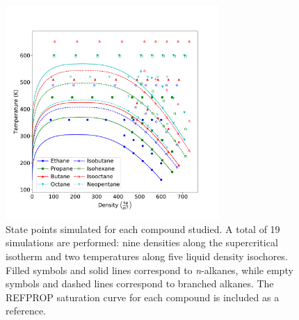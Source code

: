 \documentclass[preprint,letterpaper,floatfix,citeautoscript,aip,jcp]{revtex4-1}
\begin{document}

\begin{figure}[htb!]
	\centering
	\includegraphics[width=3.2in]{simulation_conditions}
	\caption{State points simulated for each compound studied. A total of 19 simulations are performed: nine densities along the supercritical isotherm and two temperatures along five liquid density isochores. Filled symbols and solid lines correspond to \textit{n}-alkanes, while empty symbols and dashed lines correspond to branched alkanes. The REFPROP saturation curve for each compound is included as a reference.}
	\label{fig:simulation_conditions}
\end{figure}
\end{document}
